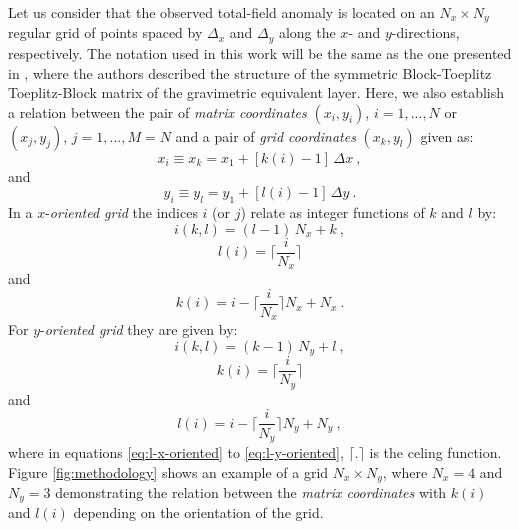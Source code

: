 Let us consider that the observed total-field anomaly is located on an $N_x \times N_y$ regular grid of points spaced by $\Delta_x$ and $\Delta_y$ along the $x$- and $y$-directions, respectively.
The notation used in this work will be the same as the one presented in \cite{takahashi2020convolutional}, where the authors described the structure of the symmetric Block-Toeplitz Toeplitz-Block matrix of the gravimetric equivalent layer. Here, we also establish a relation between the pair of \emph{matrix coordinates} $(x_i, y_i)$, $i = 1, ..., N$ or $(x_j, y_j)$, $j = 1, ..., M = N $ and a pair of \emph{grid coordinates} $(x_k, y_l)$ given as:
\begin{equation}
x_{i} \equiv x_{k} = x_{1} + \left[ k(i) - 1 \right] \, \Delta x \: , 
\label{eq:xi}
\end{equation}
and
\begin{equation}
y_{i} \equiv y_{l} = y_{1} + \left[ l(i) - 1 \right] \, \Delta y \: .
\label{eq:yi}
\end{equation}
In a $x$-\textit{oriented grid} the indices $i$ (or $j$) relate as integer functions of $k$ and $l$ by:
\begin{equation}
i(k, l) = (l - 1) \, N_{x} + k \: ,
\label{eq:i-x-oriented}
\end{equation}
\begin{equation}
l(i) = \Bigg\lceil \frac{i}{N_{x}} \Bigg\rceil
\label{eq:l-x-oriented}
\end{equation}
and
\begin{equation}
k(i)  = i - \Bigg\lceil \frac{i}{N_{x}} \Bigg\rceil N_{x} + N_{x} \: .
\label{eq:k-x-oriented}
\end{equation}
For  $y$-\textit{oriented grid} they are given by:
\begin{equation}
i(k, l) = (k - 1) \, N_{y} + l \: ,
\label{eq:i-y-oriented}
\end{equation}
\begin{equation}
k(i) = \Bigg\lceil \frac{i}{N_{y}} \Bigg\rceil
\label{eq:k-y-oriented}
\end{equation}
and
\begin{equation}
l(i) = i - \Bigg\lceil \frac{i}{N_{y}} \Bigg\rceil N_{y} + N_{y} \: ,
\label{eq:l-y-oriented}
\end{equation}
where in equations \ref{eq:l-x-oriented} to \ref{eq:l-y-oriented}, $\lceil .\rceil$ is the celing function.
Figure \ref{fig:methodology} shows an example of a grid $N_{x} \times N_{y}$, where $N_{x} = 4$ and $N_{y} = 3$ demonstrating the relation between the \emph{matrix coordinates} with $k(i)$ and $l(i)$ depending on the orientation of the grid.

